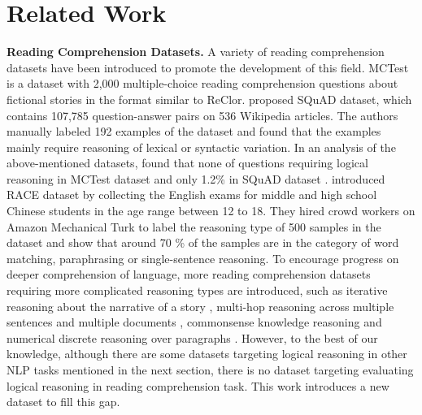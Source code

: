 \documentclass{article} \usepackage{iclr2020_conference,times}
\begin{document}
\section{Related Work}
\vspace{-2mm}
\textbf{Reading Comprehension Datasets. } 
A variety of reading comprehension datasets have been introduced to promote the development of this field. MCTest \citep{richardson2013mctest} is a dataset with 2,000 multiple-choice reading comprehension questions about fictional stories in the format similar to ReClor.  \citet{rajpurkar2016squad} proposed SQuAD dataset, which contains 107,785 question-answer pairs on 536 Wikipedia articles. The authors manually labeled 192 examples of the dataset and found that the examples mainly require reasoning of lexical or syntactic variation. In an analysis of the above-mentioned datasets, \citet{sugawara2016analysis} found that none of questions requiring logical reasoning in MCTest dataset \citep{richardson2013mctest} and only 1.2\% in SQuAD dataset \citep{rajpurkar2016squad}. \citet{lai2017race} introduced RACE dataset by collecting the English exams for middle and high school Chinese students in the age range between 12 to 18. They hired crowd workers on Amazon Mechanical Turk to label the reasoning type of 500 samples in the dataset and show that around 70 \% of the samples are in the category of word matching, paraphrasing or single-sentence reasoning. To encourage progress on deeper comprehension of language, more reading comprehension datasets requiring more complicated reasoning types are introduced, such as iterative reasoning about the narrative of a story \citep{kovcisky2018narrativeqa}, multi-hop reasoning across multiple sentences \citep{khashabi2018looking} and multiple documents \citep{welbl2018constructing}, commonsense knowledge reasoning \citep{mihaylov2018can, zhang2018record, huang2019cosmos} and numerical discrete reasoning over paragraphs \citep{dua2019drop}. However, to the best of our knowledge, although there are some datasets targeting logical reasoning in other NLP tasks mentioned in the next section, there is no dataset targeting evaluating logical reasoning in reading comprehension task. This work introduces a new dataset to fill this gap.
\end{document}

